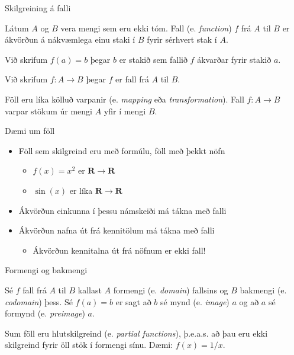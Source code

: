 \documentclass{beamer}
\begin{document}
\begin{frame}{Skilgreining á falli}
\begin{tcolorbox}[title=Fall]
Látum $A$ og $B$ vera mengi sem eru ekki tóm. Fall (e. \emph{function}) $f$ frá $A$ til $B$ er ákvörðun á nákvæmlega einu staki í $B$ fyrir sérhvert stak í $A$.

Við skrifum $f(a) = b$ þegar $b$ er stakið sem fallið $f$ ákvarðar fyrir stakið $a$.

Við skrifum $f: A \to B$ þegar $f$ er fall frá $A$ til $B$.
\end{tcolorbox}

Föll eru líka kölluð varpanir (e. \emph{mapping} eða \emph{transformation}). Fall $f: A \to B$ varpar stökum úr mengi $A$ yfir í mengi $B$.
\end{frame}

\begin{frame}{Dæmi um föll}
\begin{itemize}
 \item Föll sem skilgreind eru með formúlu, föll með þekkt nöfn
 \begin{itemize}
  \item $f(x) = x^2$ er $\mathbf{R} \to \mathbf{R}$
  \item $\sin(x)$ er líka $\mathbf{R} \to \mathbf{R}$
 \end{itemize}
 \item Ákvörðun einkunna í þessu námskeiði má tákna með falli
 \item Ákvörðun nafna út frá kennitölum má tákna með falli \pause
 \begin{itemize}
  \item Ákvörðun kennitalna út frá nöfnum er ekki fall!
 \end{itemize}
\end{itemize}
\end{frame}

\begin{frame}{Formengi og bakmengi}
\begin{tcolorbox}[title=Formengi og bakmengi]
Sé $f$ fall frá $A$ til $B$ kallast $A$ formengi (e. \emph{domain}) fallsins og $B$ bakmengi (e. \emph{codomain}) þess. Sé $f(a) = b$ er sagt að $b$ sé mynd (e. \emph{image}) $a$ og að $a$ sé formynd (e. \emph{preimage}) $a$.
\end{tcolorbox}
Sum föll eru hlutskilgreind (e. \emph{partial functions}), þ.e.a.s. að þau eru ekki skilgreind fyrir öll stök í formengi sínu. Dæmi: $f(x) = 1/x$.
\end{frame}
\end{document}
